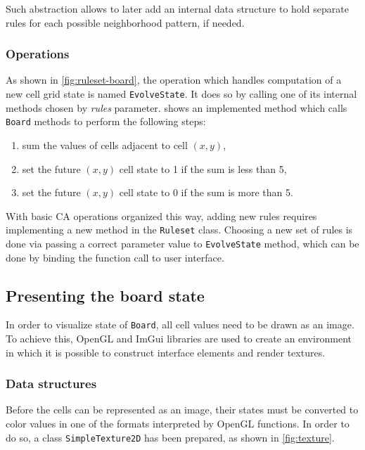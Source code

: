 \documentclass[12pt]{report}
\begin{document}
Such abstraction allows to later add an internal data structure to hold separate rules for each possible neighborhood pattern, if needed. 

\subsubsection{Operations}

As shown in \cref{fig:ruleset-board}, the operation which handles computation of a new cell grid state is named \texttt{EvolveState}. It does so by calling one of its internal methods chosen by \textit{rules} parameter.  shows an implemented method which calls \texttt{Board} methods to perform the following steps:

\begin{enumerate}
	\item sum the values of cells adjacent to cell $(x,y)$,
	\item set the future $(x,y)$ cell state to 1 if the sum is less than 5,
	\item set the future $(x,y)$ cell state to 0 if the sum is more than 5.
\end{enumerate}




With basic CA operations organized this way, adding new rules requires implementing a new method in the \texttt{Ruleset} class. Choosing a new set of rules is done via passing a correct parameter value to \texttt{EvolveState} method, which can be done by binding the function call to user interface.

\subsection{Presenting the board state}

In order to visualize state of \texttt{Board}, all cell values need to be drawn as an image. To achieve this, OpenGL and ImGui libraries are used to create an environment in which it is possible to construct interface elements and render textures.    

\subsubsection{Data structures}

Before the cells can be represented as an image, their states must be converted to color values in one of the formats interpreted by OpenGL functions. In order to do so, a class \texttt{SimpleTexture2D} has been prepared, as shown in \cref{fig:texture}. 
\end{document}

